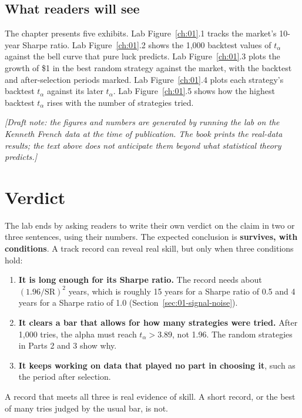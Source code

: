\subsection*{What readers will see}

The chapter presents five exhibits. Lab Figure~\ref{ch:01}.1 tracks the market's 10-year Sharpe ratio. Lab Figure~\ref{ch:01}.2 shows the 1,000 backtest values of $t_\alpha$ against the bell curve that pure luck predicts. Lab Figure~\ref{ch:01}.3 plots the growth of \$1 in the best random strategy against the market, with the backtest and after-selection periods marked. Lab Figure~\ref{ch:01}.4 plots each strategy's backtest $t_\alpha$ against its later $t_\alpha$. Lab Figure~\ref{ch:01}.5 shows how the highest backtest $t_\alpha$ rises with the number of strategies tried.

\emph{[Draft note: the figures and numbers are generated by running the lab on the Kenneth French data at the time of publication. The book prints the real-data results; the text above does not anticipate them beyond what statistical theory predicts.]}

\section{Verdict}
\label{sec:01-verdict}

The lab ends by asking readers to write their own verdict on the claim in two or three sentences, using their numbers. The expected conclusion is \textbf{survives, with conditions}. A track record can reveal real skill, but only when three conditions hold:

\begin{enumerate}
  \item \textbf{It is long enough for its Sharpe ratio.} The record needs about $(1.96/\mathrm{SR})^2$ years, which is roughly 15 years for a Sharpe ratio of 0.5 and 4 years for a Sharpe ratio of 1.0 (Section~\ref{sec:01-signal-noise}).
  \item \textbf{It clears a bar that allows for how many strategies were tried.} After 1,000 tries, the alpha must reach $t_\alpha > 3.89$, not 1.96. The random strategies in Parts 2 and 3 show why.
  \item \textbf{It keeps working on data that played no part in choosing it}, such as the period after selection.
\end{enumerate}

A record that meets all three is real evidence of skill. A short record, or the best of many tries judged by the usual bar, is not.

